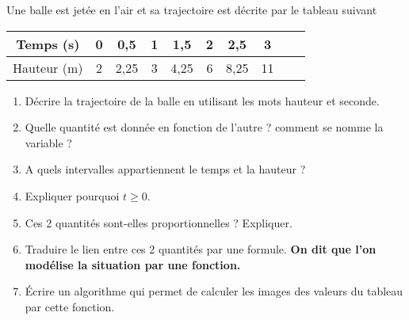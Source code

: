 
Une balle est jetée en l’air et sa trajectoire est décrite par le tableau suivant

\begin{center}
\begin{tabular}{|c|c|c|c|c|c|c|c|c|c|}
\hline 
Temps (s) & 0 & 0,5 & 1 & 1,5 & 2 & 2,5 & 3  \\ 
\hline 
Hauteur (m) & 2 & 2,25 & 3 & 4,25 & 6 & 8,25 & 11  \\ 
\hline 
\end{tabular} 
\end{center}


\begin{enumerate}
\item Décrire la trajectoire de la balle en utilisant les mots hauteur et seconde.
\item Quelle quantité est donnée en fonction de l'autre ? comment se nomme la variable ?
\item A quels intervalles appartiennent le temps et la hauteur ?
\item Expliquer pourquoi $t \geq 0$.
\item Ces 2 quantités sont-elles proportionnelles ? Expliquer.
\item Traduire le lien entre ces 2 quantités par une formule. \textbf{On dit que l'on modélise la situation par une fonction.}
\item Écrire un algorithme qui permet de calculer les images des valeurs du tableau par cette fonction.
\end{enumerate}
 